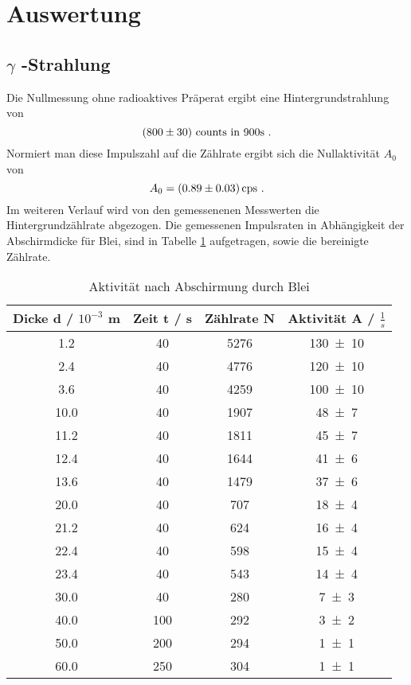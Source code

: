 \section{Auswertung}
\label{sec:Auswertung}
\subsection{\texorpdfstring{$\gamma$ -Strahlung }%
                               {gamma -Strahlung}}
Die Nullmessung ohne radioaktives Präperat ergibt eine Hintergrundstrahlung von
\begin{equation}
  (\num{800 +- 30}) \text{ counts in } 900 \text{s} \ .
  \label{eqn:gammacoun}
\end{equation}
Normiert man diese Impulszahl auf die Zählrate ergibt sich die Nullaktivität $A_0$ von
\begin{equation}
  A_0 = (\num{0.89 +- 0.03}) \, \text{cps} \ .
  \label{eqn:A0}
\end{equation}
Im weiteren Verlauf wird von den gemessenenen Messwerten die Hintergrundzählrate abgezogen. Die gemessenen Impulsraten in Abhängigkeit der Abschirmdicke für Blei, sind in Tabelle \ref{tab:ABlei} aufgetragen, sowie die bereinigte Zählrate.
\begin{table}
  \centering
  \begin{tabular}{c c c c}
    \toprule
    Dicke d / $10^{-3}$ m & Zeit t / s & Zählrate N & Aktivität A / $\frac{1}{s}$ \\
    \midrule
    	1.2	&40 	&5276	&\num{130 +- 10} 	\\
	2.4	&40 	&4776	&\num{120 +- 10}	\\
	3.6	&40 	&4259	&\num{100 +- 10}	\\
	10.0	&40 	&1907	&\num{48 +- 7}	\\
	11.2	&40 	&1811	&\num{45 +- 7}	\\
	12.4	&40 	&1644	&\num{41 +- 6}	\\
	13.6	&40 	&1479	&\num{37 +- 6}	\\
	20.0	&40 	&707	&\num{18 +- 4}	\\
	21.2	&40 	&624	&\num{16 +- 4}	\\
	22.4	&40 	&598	&\num{15 +- 4}	\\
	23.4	&40 	&543	&\num{14 +- 4}	\\
	30.0	&40 	&280	&\num{7 +- 3}	\\
	40.0	&100	&292	&\num{3 +- 2}	\\
	50.0	&200	&294	&\num{1 +- 1}	\\
	60.0	&250	&304	&\num{1 +- 1}	\\
    \bottomrule
  \end{tabular}
  \caption{Aktivität nach Abschirmung durch Blei}
  \label{tab:ABlei}
\end{table}
